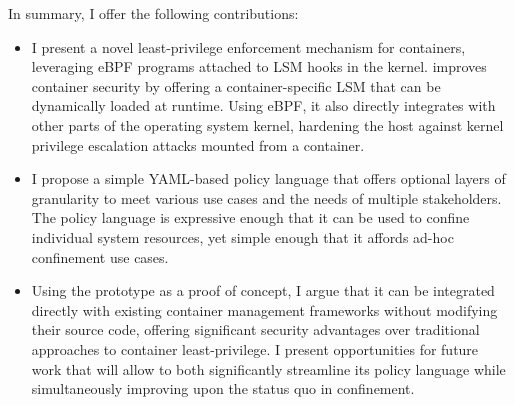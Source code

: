 In summary, I offer the following contributions:
\begin{itemize}
  \item I present \bpfcontain{} a novel least-privilege enforcement mechanism for containers, leveraging eBPF programs attached to LSM hooks in the kernel. \bpfcontain{} improves container security by offering a container-specific LSM that can be dynamically loaded at runtime. Using eBPF, it also directly integrates with other parts of the operating system kernel, hardening the host against kernel privilege escalation attacks mounted from a container.

  \item I propose a simple YAML-based policy language that offers optional layers of granularity to meet various use cases and the needs of multiple stakeholders. The policy language is expressive enough that it can be used to confine individual system resources, yet simple enough that it affords ad-hoc confinement use cases.

  \item Using the \bpfcontain{} prototype as a proof of concept, I argue that it can be integrated directly with existing container management frameworks without modifying their source code, offering significant security advantages over traditional approaches to container least-privilege. I present opportunities for future work that will allow \bpfcontain{} to both significantly streamline its policy language while simultaneously improving upon the status quo in confinement.
\end{itemize}

